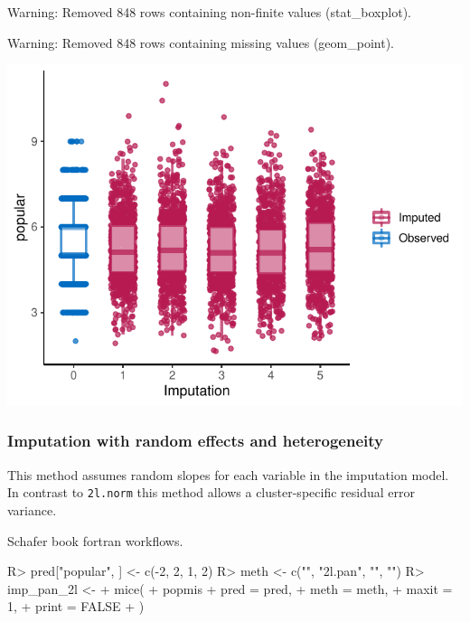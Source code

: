 \documentclass[
]{jss}
\begin{document}
\begin{CodeChunk}
\begin{CodeOutput}
Warning: Removed 848 rows containing non-finite values (stat_boxplot).
\end{CodeOutput}
\begin{CodeOutput}
Warning: Removed 848 rows containing missing values (geom_point).
\end{CodeOutput}


\begin{center}\includegraphics{Manuscript_files/figure-latex/pop_norm_eval-1} \end{center}

\end{CodeChunk}

\hypertarget{imputation-with-random-effects-and-heterogeneity}{%
\subsubsection{Imputation with random effects and
heterogeneity}\label{imputation-with-random-effects-and-heterogeneity}}

This method assumes random slopes for each variable in the imputation
model. In contrast to \texttt{2l.norm} this method allows a
cluster-specific residual error variance.

Schafer book fortran workflows.

\begin{CodeChunk}
\begin{CodeInput}
R> pred["popular", ] <- c(-2, 2, 1, 2)
R> meth <- c("", "2l.pan", "", "")
R> imp_pan_2l <-
+   mice(
+     popmis %
+     pred = pred,
+     meth = meth,
+     maxit = 1,
+     print = FALSE
+   )
\end{CodeInput}
\end{CodeChunk}
\end{document}

